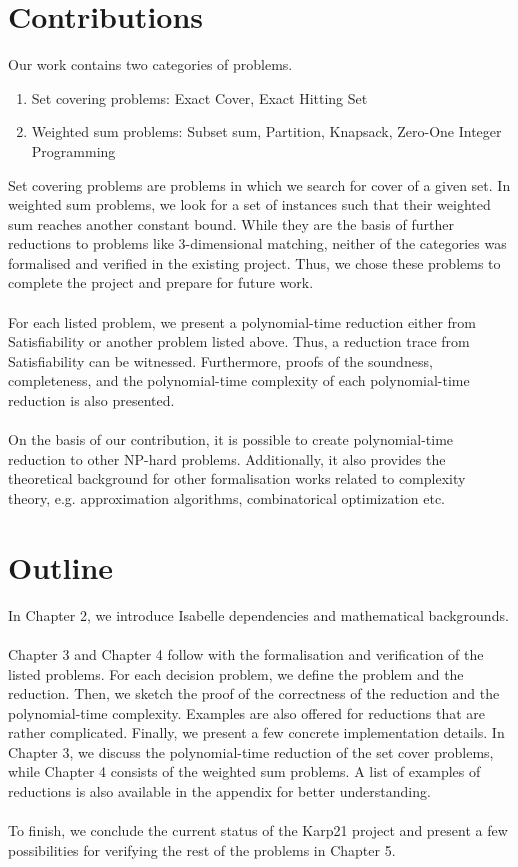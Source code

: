 \section{Contributions}
Our work contains two categories of problems. 
\begin{enumerate}
    \item Set covering problems: Exact Cover, Exact Hitting Set
    \item Weighted sum problems: Subset sum, Partition, Knapsack, Zero-One Integer Programming
\end{enumerate}
Set covering problems are problems in which we search for cover of a given set. In weighted sum problems, 
we look for a set of instances such that their weighted sum reaches another constant bound. While they are the basis of further reductions to problems like 
3-dimensional matching, neither of the categories was formalised and verified in the existing project. 
Thus, we chose these problems to complete the project and prepare for future work.\\\\ 
For each listed problem, we present a polynomial-time reduction either from Satisfiability or another problem listed above. 
Thus, a reduction trace from Satisfiability can be witnessed. 
Furthermore, proofs of the soundness, completeness, 
and the polynomial-time complexity of each polynomial-time reduction is also presented. \\\\
On the basis of our contribution, it is possible to create polynomial-time reduction to other NP-hard problems. 
Additionally, it also provides the theoretical background for other formalisation works related to complexity theory, e.g. 
approximation algorithms, combinatorical optimization etc. 

\section{Outline}
In Chapter 2, we introduce Isabelle dependencies and mathematical backgrounds.\\\\
Chapter 3 and Chapter 4 follow with the formalisation and verification of the listed problems. For each decision problem, 
we define the problem and the reduction. Then, we sketch the proof of the correctness of the reduction and the polynomial-time complexity.
Examples are also offered for reductions that are rather complicated. Finally, we present a few concrete implementation details.
In Chapter 3, we discuss the polynomial-time reduction of the set cover problems, while Chapter 4 consists of the weighted sum problems.
A list of examples of reductions is also available in the appendix for better understanding. \\\\
To finish, we conclude the current status of the Karp21 project
and present a few possibilities for verifying the rest of the problems in Chapter 5.
